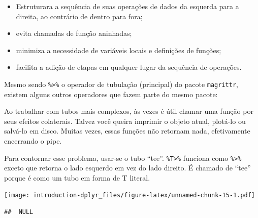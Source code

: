 \documentclass[a4paper]{book}
\newenvironment{Shaded}{\begin{snugshade}}{\end{snugshade}}
\newcommand{\DataTypeTok}[1]{\textcolor[rgb]{0.13,0.29,0.53}{#1}}
\newcommand{\DecValTok}[1]{\textcolor[rgb]{0.00,0.00,0.81}{#1}}
\newcommand{\KeywordTok}[1]{\textcolor[rgb]{0.13,0.29,0.53}{\textbf{#1}}}
\newcommand{\NormalTok}[1]{#1}
\newcommand{\OperatorTok}[1]{\textcolor[rgb]{0.81,0.36,0.00}{\textbf{#1}}}
\newcommand{\StringTok}[1]{\textcolor[rgb]{0.31,0.60,0.02}{#1}}
\begin{document}
\begin{itemize}
\item
  Estruturara a sequência de suas operações de dados da esquerda para a direita, ao contrário de dentro para fora;
\item
  evita chamadas de função aninhadas;
\item
  minimiza a necessidade de variáveis locais e definições de funções;
\item
  facilita a adição de etapas em qualquer lugar da sequência de operações.
\end{itemize}

Mesmo sendo \texttt{\%\textgreater{}\%} o operador de tubulação (principal) do pacote \texttt{magrittr}, existem alguns outros operadores que fazem parte do mesmo pacote:

Ao trabalhar com tubos mais complexos, às vezes é útil chamar uma função por seus efeitos colaterais. Talvez você queira imprimir o objeto atual, plotá-lo ou salvá-lo em disco. Muitas vezes, essas funções não retornam nada, efetivamente encerrando o pipe.

Para contornar esse problema, usar-se o tubo ``tee''. \texttt{\%T\textgreater{}\%} funciona como \texttt{\%\textgreater{}\%} exceto que retorna o lado esquerdo em vez do lado direito. É chamado de ``tee'' porque é como um tubo em forma de T literal.

\begin{Shaded}
\end{Shaded}

\texttt{[image: introduction-dplyr\_files/figure-latex/unnamed-chunk-15-1.pdf]}

\begin{verbatim}
##  NULL
\end{verbatim}

\begin{Shaded}
\end{Shaded}
\end{document}

